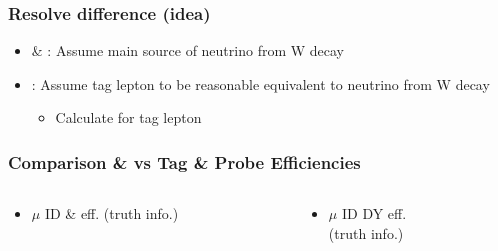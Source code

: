 \documentclass{beamer}
\begin{document}
\begin{frame}
 \frametitle{Resolve difference (idea)}
 \begin{itemize}
  \item \ttbar \& \wpj: Assume main source of \MHT neutrino from W decay
  \item \Zll: Assume tag lepton to be reasonable equivalent to neutrino from W decay
  \begin{itemize}
   \item Calculate \mindeltaphi for tag lepton \pt
  \end{itemize}
 \end{itemize}
\end{frame}
\begin{frame}
 \frametitle{Comparison \ttbar \& \wpj vs Tag \& Probe Efficiencies}
  \begin{columns}

   \begin{column}{0.33\textwidth}
     \begin{itemize}
   \item $\mu$ ID \ttbar \& \wpj eff. (truth info.)
  \end{itemize}
   \end{column}
   \begin{column}{0.33\textwidth}
   \begin{itemize}
    \item $\mu$ ID DY eff.\\ (truth info.)
   \end{itemize}


\end{column}
\end{columns}
\end{frame}
\end{document}
